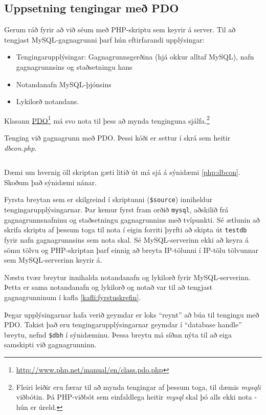 \subsection{Uppsetning tengingar með PDO}
Gerum ráð fyrir að við séum með PHP-skriptu sem keyrir á server. Til að tengjast MySQL-gagnagrunni þarf hún eftirfarandi upplýsingar:
\begin{itemize}
 \item Tengingarupplýsingar: Gagnagrunnsgerðina (hjá okkur alltaf MySQL), nafn gagnagrunnsins og staðsetningu hans
 \item Notandanafn MySQL-þjónsins
 \item Lykilorð notandans.
\end{itemize}
Klasann \href{http://www.php.net/manual/en/class.pdo.php}{PDO}\footnote{\url{http://www.php.net/manual/en/class.pdo.php}} má svo nota til þess að mynda tenginguna sjálfa.\footnote{Fleiri leiðir eru færar til að mynda tengingar af þessum toga, til dæmis \emph{mysqli} viðbótin. Þá PHP-viðbót sem einfaldlega heitir \emph{mysql} skal þó alls ekki nota - hún er úreld.}

\begin{example}
\caption[Tenging við gagnagrunn með PDO]{Tenging við gagnagrunn með PDO. Þessi kóði er settur í skrá sem heitir \emph{dbcon.php}.}
\label{php:dbcon}
\centering
\inputminted[frame=lines, fontfamily=courier]{php}{php/dbcon.php}
\end{example}

Dæmi um hvernig öll skriptan gæti litið út má sjá á sýnidæmi \ref{php:dbcon}. Skoðum það sýnidæmi nánar.

Fyrsta breytan sem er skilgreind í skriptunni (\verb|$source|) inniheldur tengingarupplýsingarnar. Þar kemur fyrst fram orðið \verb|mysql|, aðskilið frá gagnagrunnsnafninu og staðsetningu gagnagrunnins með tvípunkti. Sé ætlunin að skrifa skriptu af þessum toga til nota í eigin forriti þyrfti að skipta út \verb|testdb| fyrir nafn gagnagrunnsins sem nota skal. Sé MySQL-serverinn ekki að keyra á sömu tölvu og PHP-skriptan þarf einnig að breyta IP-tölunni í IP-tölu tölvunnar sem MySQL-serverinn keyrir á.

Næstu tvær breytur innihalda notandanafn og lykilorð fyrir MySQL-serverinn. Þetta er sama notandanafn og lykilorð og notað var til að tengjast gagnagrunninum í kafla \ref{kafli:fyrstuskrefin}.

Þegar upplýsingarnar hafa verið geymdar er loks ``reynt'' að búa til tengingu með PDO. Takist það eru tengingarupplýsingarnar geymdar í  ``database handle'' breytu, nefnd \verb|$dbh| í sýnidæminu. Þessa breytu má síðan nýta til að eiga samskipti við gagnagrunninn.

